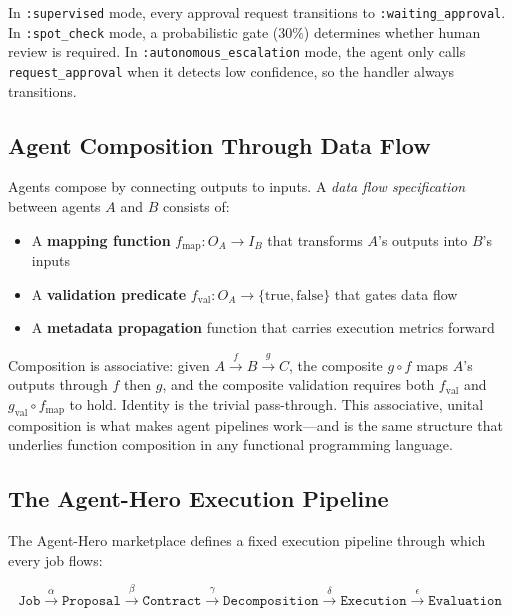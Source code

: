 \documentclass[12pt,a4paper]{article}
\theoremstyle{definition}
\theoremstyle{remark}
\begin{document}
In \texttt{:supervised} mode, every approval request transitions to \texttt{:waiting\_approval}. In \texttt{:spot\_check} mode, a probabilistic gate (30\%) determines whether human review is required. In \texttt{:autonomous\_escalation} mode, the agent only calls \texttt{request\_approval} when it detects low confidence, so the handler always transitions.

\subsection{Agent Composition Through Data Flow}

Agents compose by connecting outputs to inputs. A \emph{data flow specification} between agents $A$ and $B$ consists of:

\begin{itemize}[leftmargin=2em]
  \item A \textbf{mapping function} $f_{\text{map}}: O_A \to I_B$ that transforms $A$'s outputs into $B$'s inputs
  \item A \textbf{validation predicate} $f_{\text{val}}: O_A \to \{\text{true}, \text{false}\}$ that gates data flow
  \item A \textbf{metadata propagation} function that carries execution metrics forward
\end{itemize}

Composition is associative: given $A \xrightarrow{f} B \xrightarrow{g} C$, the composite $g \circ f$ maps $A$'s outputs through $f$ then $g$, and the composite validation requires both $f_{\text{val}}$ and $g_{\text{val}} \circ f_{\text{map}}$ to hold. Identity is the trivial pass-through. This associative, unital composition is what makes agent pipelines work---and is the same structure that underlies function composition in any functional programming language.

\subsection{The Agent-Hero Execution Pipeline}

The Agent-Hero marketplace defines a fixed execution pipeline through which every job flows:

\begin{equation}\label{eq:pipeline}
  \texttt{Job} \xrightarrow{\alpha} \texttt{Proposal} \xrightarrow{\beta} \texttt{Contract} \xrightarrow{\gamma} \texttt{Decomposition} \xrightarrow{\delta} \texttt{Execution} \xrightarrow{\epsilon} \texttt{Evaluation}
\end{equation}
\end{document}

